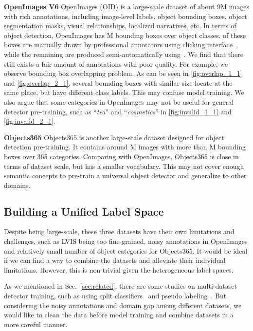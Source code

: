 \documentclass[10pt,twocolumn,letterpaper]{article}
\begin{document}
\noindent \textbf{OpenImages V6} 
OpenImages (OID) is a large-scale dataset of about 9M images with rich annotations, including image-level labels, object bounding boxes, object segmentation masks, visual relationships, localized narratives, etc.
In terms of object detection, OpenImages has M bounding boxes over  object classes.
 of these boxes are manually drawn by professional annotators using clicking interface~\cite{papadopoulos2017extreme}, while the remaining  are produced semi-automatically using~\cite{papadopoulos2016we}.
We find that there still exists a fair amount of annotations with poor quality.
For example, we observe bounding box overlapping problem. As can be seen in \cref{fig:overlap_1_1} and \cref{fig:overlap_2_1}, several bounding boxes with similar size locate at the same place, but have different class labels. This may confuse model training. 
We also argue that some categories in OpenImages may not be useful for general detector pre-training, such as ``\textit{tea}'' and ``\textit{cosmetics}'' in \cref{fig:invalid_1_1} and \cref{fig:invalid_2_1}.

\noindent \textbf{Objects365} 
Objects365 is another large-scale dataset designed for object detection pre-training. 
It contains around M images with more than M bounding boxes over 365 categories.
Comparing with OpenImages, Objects365 is close in terms of dataset scale, but has a smaller vocabulary. 
This may not cover enough semantic concepts to pre-train a universal object detector and generalize to other domains.

\subsection{Building a Unified Label Space}
\label{subsec:build}

Despite being large-scale, these three datasets have their own limitations and challenges, such as LVIS being too fine-grained, noisy annotations in OpenImages and relatively small number of object categories for Objects365. 
It would be ideal if we can find a way to combine the datasets and alleviate their individual limitations.
However, this is non-trivial given the heterogeneous label spaces.

As we mentioned in Sec.~\ref{sec:related}, there are some studies on multi-dataset detector training, such as using split classifiers~\cite{wang2019towards,zhou2021simple} and pseudo labeling~\cite{zhao2020object}. But considering the noisy annotations and domain gap among different datasets, we would like to clean the data before model training and combine datasets in a more careful manner.
\end{document}
